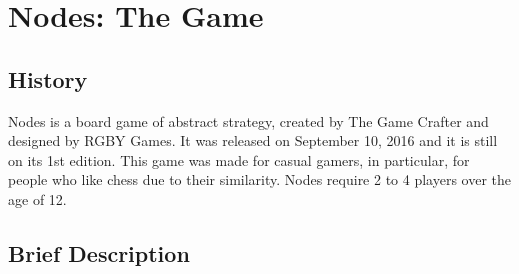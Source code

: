 \documentclass[a4paper]{article}
\begin{document}

\newpage

%
%
%
%
%
%
%


\section{Nodes: The Game}

\subsection{History}

Nodes is a board game of abstract strategy, created by The Game Crafter and designed by RGBY Games. It was released on September 10, 2016 and it is still on its 1st edition. This game was made for casual gamers, in particular, for people who like chess due to their similarity. Nodes require 2 to 4 players over the age of 12.


\subsection{Brief Description}
\end{document}
